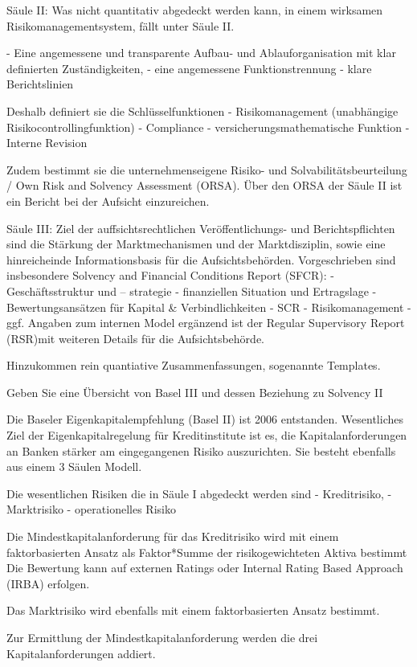 Säule II:
Was nicht quantitativ abgedeckt werden kann, in einem wirksamen Risikomanagementsystem, fällt unter Säule II.

- Eine angemessene und transparente Aufbau- und Ablauforganisation mit klar
definierten Zuständigkeiten,
- eine angemessene Funktionstrennung
- klare Berichtslinien

Deshalb definiert sie die Schlüsselfunktionen 
- Risikomanagement (unabhängige Risikocontrollingfunktion)
- Compliance
- versicherungsmathematische Funktion
- Interne Revision 

Zudem bestimmt sie die
unternehmenseigene Risiko- und Solvabilitätsbeurteilung /
Own Risk and Solvency Assessment (ORSA). 
Über den ORSA der Säule II ist ein Bericht bei der Aufsicht einzureichen.

Säule III:
Ziel der auffsichtsrechtlichen Veröffentlichungs- und Berichtspflichten
sind die Stärkung der Marktmechanismen und der Marktdisziplin, sowie eine hinreicheinde Informationsbasis für die Aufsichtsbehörden.
Vorgeschrieben sind insbesondere
Solvency and Financial Conditions Report (SFCR):
-  Geschäftsstruktur und – strategie
-  finanziellen Situation und Ertragslage
-  Bewertungsansätzen für Kapital  & Verbindlichkeiten
-  SCR
-  Risikomanagement
-  ggf.  Angaben zum internen  Model
ergänzend ist der Regular Supervisory Report (RSR)mit weiteren Details für die Aufsichtsbehörde.

Hinzukommen rein quantiative Zusammenfassungen, sogenannte Templates.



Geben Sie eine Übersicht von Basel III und dessen Beziehung zu Solvency II 

Die Baseler Eigenkapitalempfehlung (Basel II) ist 2006 entstanden.
Wesentliches Ziel der Eigenkapitalregelung für Kreditinstitute ist es, 
die Kapitalanforderungen an Banken stärker am eingegangenen Risiko auszurichten.
Sie besteht ebenfalls aus einem 3 Säulen Modell.

Die wesentlichen Risiken die in Säule I abgedeckt werden sind
- Kreditrisiko,
- Marktrisiko 
- operationelles Risiko

Die Mindestkapitalanforderung für das Kreditrisiko wird mit einem 
faktorbasierten Ansatz als Faktor*Summe der risikogewichteten Aktiva bestimmt
Die Bewertung kann auf externen Ratings oder Internal Rating Based Approach (IRBA)
erfolgen.

Das Marktrisiko wird ebenfalls mit einem faktorbasierten Ansatz bestimmt. 

Zur Ermittlung der Mindestkapitalanforderung werden die drei Kapitalanforderungen addiert.

